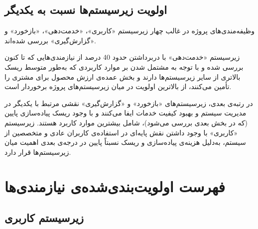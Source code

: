 \subsection{اولویت زیرسیستم‌ها نسبت به یکدیگر}
وظیفه‌مندی‌های پروژه در غالب چهار زیرسیستم «کاربری»، «خدمت‌دهی»، «بازخورد» و «گزارش‌گیری» بررسی شده‌اند.

زیرسیستم «خدمت‌دهی» با دربرداشتن حدود 40 درصد از نیازمندی‌هایی که تا کنون بررسی شده و با توجه به مشتمل شدن بر موارد کاربردی که به‌طور متوسط ریسک بالاتری از سایر زیرسیستم‌ها دارند و بخش عمده‌ی ارزش محصول برای مشتری را تأمین می‌کنند، از بالاترین اولویت در میان زیرسیستم‌های پروژه برخوردار است.

در رتبه‌ی بعدی، زیرسیستم‌های «بازخورد» و «گزارش‌گیری» نقشی مرتبط با یکدیگر در مدیریت سیستم و بهبود کیفیت خدمات ایفا می‌کنند و با وجود ریسک پیاده‌سازی پایین (که در بخش بعدی بررسی می‌شود)، شامل بیشترین موارد کاربرد
هستند. زیرسیستم «کاربری» با وجود داشتن نقش پایه‌ای در استفاده‌ی کاربران عادی و متخصصین از سیستم، به‌دلیل هزینه‌ی پیاده‌سازی و ریسک نسبتاً پایین در درجه‌ی بعدی اهمیت میان زیرسیستم‌ها قرار دارد.

\section{فهرست اولویت‌بندی‌شده‌ی نیازمندی‌ها}

\subsection{زیرسیستم کاربری}

